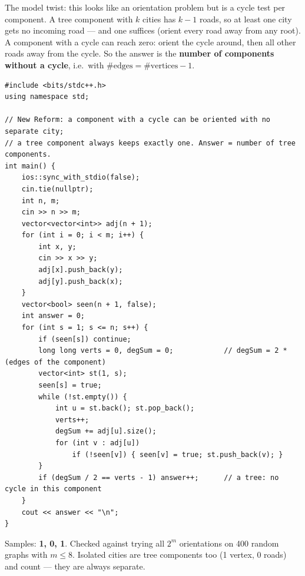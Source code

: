 \begin{solutionbox}
The model twist: this looks like an orientation problem but is a cycle test per component. A tree component with $k$ cities has $k - 1$ roads, so at least one city gets no incoming road --- and one suffices (orient every road away from any root). A component with a cycle can reach zero: orient the cycle around, then all other roads away from the cycle. So the answer is the \textbf{number of components without a cycle}, i.e.\ with $\#\text{edges} = \#\text{vertices} - 1$.
\begin{lstlisting}[style=cpp]
#include <bits/stdc++.h>
using namespace std;

// New Reform: a component with a cycle can be oriented with no separate city;
// a tree component always keeps exactly one. Answer = number of tree components.
int main() {
    ios::sync_with_stdio(false);
    cin.tie(nullptr);
    int n, m;
    cin >> n >> m;
    vector<vector<int>> adj(n + 1);
    for (int i = 0; i < m; i++) {
        int x, y;
        cin >> x >> y;
        adj[x].push_back(y);
        adj[y].push_back(x);
    }
    vector<bool> seen(n + 1, false);
    int answer = 0;
    for (int s = 1; s <= n; s++) {
        if (seen[s]) continue;
        long long verts = 0, degSum = 0;            // degSum = 2 * (edges of the component)
        vector<int> st(1, s);
        seen[s] = true;
        while (!st.empty()) {
            int u = st.back(); st.pop_back();
            verts++;
            degSum += adj[u].size();
            for (int v : adj[u])
                if (!seen[v]) { seen[v] = true; st.push_back(v); }
        }
        if (degSum / 2 == verts - 1) answer++;      // a tree: no cycle in this component
    }
    cout << answer << "\n";
}
\end{lstlisting}
Samples: \textbf{1, 0, 1}. Checked against trying all $2^m$ orientations on 400 random graphs with $m \le 8$. Isolated cities are tree components too (1 vertex, 0 roads) and count --- they are always separate.
\end{solutionbox}

